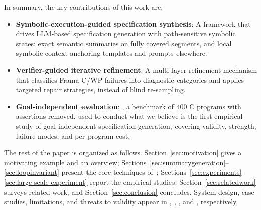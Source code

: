 In summary, the key contributions of this work are:
\begin{itemize}
\item \textbf{Symbolic-execution-guided specification synthesis}: 
A framework that drives LLM-based specification generation with path-sensitive symbolic states: exact semantic summaries on fully covered segments, and local symbolic context anchoring templates and prompts elsewhere.
\item \textbf{Verifier-guided iterative refinement}: A multi-layer refinement mechanism that classifies Frama-C/WP failures into diagnostic categories and applies targeted repair strategies, instead of blind re-sampling.
\item \textbf{Goal-independent evaluation}: \textbf{}, a benchmark of 400 C programs with assertions removed, used to conduct what we believe is the first empirical study of goal-independent specification generation, covering validity, strength, failure modes, and per-program cost.
\end{itemize}

The rest of the paper is organized as follows. Section~\ref{sec:motivation} gives a motivating example and an overview; Sections~\ref{sec:summarygeneration}--\ref{sec:loopinvariant} present the core techniques of\ \toolname; Sections~\ref{sec:experiments}--\ref{sec:large-scale-experiment} report the empirical studies; Section~\ref{sec:relatedwork} surveys related work, and Section~\ref{sec:conclusion} concludes. System design, case studies, limitations, and threats to validity appear in {}, {}, {}, and {}, respectively.
